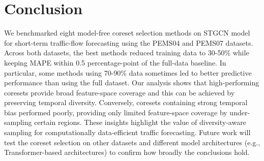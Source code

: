 \section{Conclusion}

We benchmarked eight model-free coreset selection methods on STGCN model for short-term traffic-flow forecasting using the PEMS04 and PEMS07 datasets. Across both datasets, the best methods reduced training data to 30-50\% while keeping MAPE within 0.5 percentage-point of the full-data baseline. In particular, some methods using 70-90\% data sometimes led to better predictive performance than using the full dataset. Our analysis shows that high-performing coresets provide broad feature-space coverage and this can be achieved by preserving temporal diversity. Conversely, coresets containing strong temporal bias performed poorly, providing only limited feature-space coverage by under-sampling certain regions. These insights highlight the value of diversity-aware sampling for computationally data-efficient traffic forecasting. Future work will test the coreset selection on other datasets and different model architectures (e.g., Transformer-based architectures) to confirm how broadly the conclusions hold.

